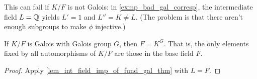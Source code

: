 \begin{remark}
    This can fail if $K/F$ is not Galois: in \cref{exmp_bad_gal_corresp}, the intermediate field $L = \mathbb{{Q}}$ yields $L' = 1$ and $L'' = K \neq L$. (The problem is that there aren't enough subgroups to make $\phi$ injective.)
\end{remark}

\begin{corollary}
    If $K/F$ is Galois with Galois group $G$, then $F = K^G$. That is, the only elements fixed by all automorphisms of $K/F$ are those in the base field $F$.
\end{corollary}

\begin{proof}
    Apply \cref{lem_int_field_imp_of_fund_gal_thm} with $L = F$.
\end{proof}

